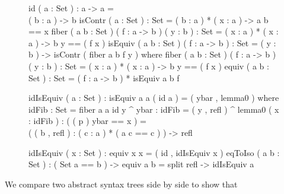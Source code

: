 \begin{figure}[H]
id ( a : Set ) : a -> a = \\ ( b : a ) -> b
isContr ( a : Set ) : Set = ( b : a ) * ( x : a ) -> a b == x
fiber ( a b  : Set ) ( f : a -> b ) ( y : b )  : Set = ( x : a ) * ( x : a ) -> b y == ( f x )
isEquiv ( a b  : Set ) ( f : a -> b )   : Set = ( y : b ) -> isContr ( fiber a b f y )
  where fiber ( a b  : Set ) ( f : a -> b ) ( y : b )  : Set = ( x : a ) * ( x : a ) -> b y == ( f x )
equiv ( a b : Set ) : Set = ( f : a -> b ) * isEquiv a b f

idIsEquiv ( a : Set ) : isEquiv a a ( id a ) =  ( ybar , lemma0 )
  where
    idFib : Set = fiber a a id y
    ^ ybar : idFib = ( y , refl )
    ^ lemma0 ( x : idFib ) : ( ( p ) ybar == x ) = \\ ( ( b , refl ) : ( c : a ) * ( a c == c ) ) -> refl

idIsEquiv ( x : Set ) : equiv x x = ( id , idIsEquiv x )
eqToIso ( a b : Set ) : ( Set a == b ) -> equiv a b = split refl -> idIsEquiv a
\end{figure}

We compare two abstract syntax trees side by side to show that 
